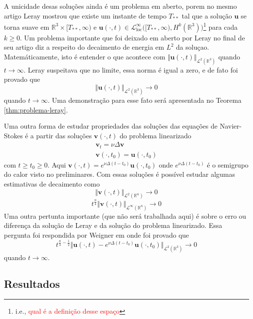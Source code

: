\documentclass[a4paper, 11pt]{book}
\theoremstyle{definition}
\newcommand{\bR}{\mathbb{R}}
\newcommand{\bu}{\mathbf{u}}
\newcommand{\bv}{\mathbf{v}}
\newcommand{\cL}{\mathcal{L}}
\newcommand{\loc}{\mathrm{loc}}
\begin{document}
A unicidade desas soluções ainda é um problema em aberto, porem no mesmo artigo Leray mostrou que existe um instante de tempo $T_{**}$ tal que a solução $\bu$ se torna suave em $\bR^3 \times [T_{**}, \infty)$ e $\bu(\cdot,t) \in \cL^{\infty}_{\loc}\big( [T_{**}, \infty), H^k(\bR^3) \big)$\footnote{i.e., \textcolor{red}{qual é a definição desse espaço}} para cada $k \geqslant 0$.
Um problema importante que foi deixado em aberto por Leray no final de seu artigo diz a respeito do decaimento de energia em $L^2$ da soluçao. Matemáticamente, isto é entender o que acontece com $\Vert \bu(\cdot,t) \Vert_{\cL^2(\bR^3)}$ quando $t \to \infty$. Leray suspeitava que no limite, essa norma é igual a zero, e de fato foi provado que
\[
    \Vert \bu(\cdot,t) \Vert_{\cL^2(\bR^3)} \to 0
\]
quando $t \to \infty$. Uma demonstração para esse fato será apresentada no Teorema \ref{thm:problema-leray}.

Uma outra forma de estudar propriedades das soluções das equações de Navier-Stokes é a partir das soluções $\bv(\cdot,t)$ do problema linearizado
\[
    \begin{aligned}
        \bv_t = \nu \Delta \bv\\
        \bv(\cdot,t_0) = \bu(\cdot,t_0)
    \end{aligned}
\]
com $t \geqslant t_0 \geqslant 0$. Aqui $\bv(\cdot,t) = e^{\nu \Delta (t-t_0)} \bu(\cdot,t_0)$ onde $e^{\nu \Delta (t-t_0)}$ é o semigrupo do calor visto no preliminares.
Com essas soluções é possível estudar algumas estimativas de decaimento como
\[
    \Vert \bv(\cdot,t) \Vert_{\cL^2(\bR^n)} \to 0
\]
\[
    t^{\frac{n}{4}}\Vert \bv(\cdot,t) \Vert_{\cL^\infty(\bR^n)} \to 0
\]
Uma outra pertunta importante (que não será trabalhada aqui) é sobre o erro ou diferença da solução de Leray e da solução do problema linearizado.
Essa pergunta foi respondida por Weigner em \cite{wiegner-decay} onde foi provado que
\[
    t^{\frac{n}{4} - \frac{1}{2}} \Vert \bu(\cdot,t) - e^{\nu \Delta (t-t_0)} \bu(\cdot,t_0) \Vert_{\cL^2(\bR^3)} \to 0
\]
quando $t \to \infty$.

\subsection{Resultados}
\end{document}
